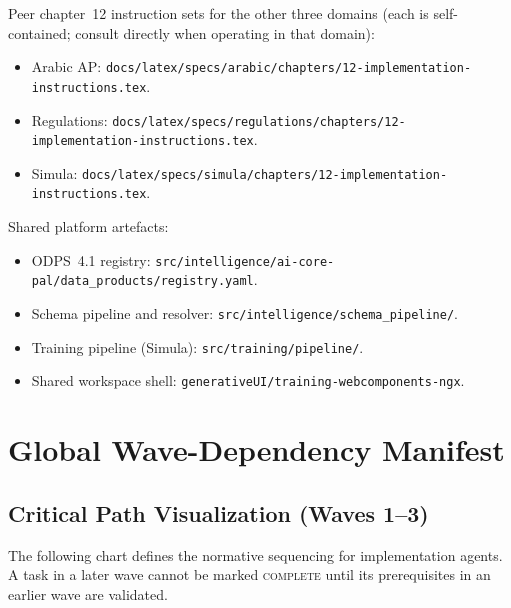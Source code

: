 \documentclass[11pt,a4paper,twoside]{report}
\begin{document}
Peer chapter~12 instruction sets for the other three domains (each
is self-contained; consult directly when operating in that domain):
\begin{itemize}
\item Arabic AP:
\texttt{docs/latex/specs/arabic/chapters/12-implementation-instructions.tex}.
\item Regulations:
\texttt{docs/latex/specs/regulations/chapters/12-implementation-instructions.tex}.
\item Simula:
\texttt{docs/latex/specs/simula/chapters/12-implementation-instructions.tex}.
\end{itemize}

Shared platform artefacts:
\begin{itemize}
\item ODPS~4.1 registry:
\texttt{src/intelligence/ai-core-pal/data\_products/registry.yaml}.
\item Schema pipeline and resolver:
\texttt{src/intelligence/schema\_pipeline/}.
\item Training pipeline (Simula):
\texttt{src/training/pipeline/}.
\item Shared workspace shell:
\texttt{generativeUI/training-webcomponents-ngx}.
\end{itemize}

\chapter{Global Wave-Dependency Manifest}
\label{ch:global-dependencies}

\section{Critical Path Visualization (Waves 1--3)}
The following chart defines the normative sequencing for implementation agents. A task in a later wave cannot be marked \textsc{complete} until its prerequisites in an earlier wave are validated.
\end{document}
